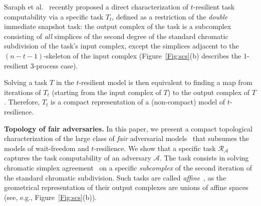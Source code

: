 \documentclass[a4paper]{article}
\newcommand{\myparagraph}[1]{\vspace{6pt}\noindent \textbf{#1}}
\newcommand{\remove}[1]{}
\def\A{\ensuremath{\mathcal{A}}}
\def\R{\ensuremath{\mathcal{R}}}
\def\fair{\textit{fair}}
\begin{document}

Saraph et al.~\cite{SHG16} recently proposed a direct characterization
of $t$-resilient %
task computability via a specific task $T_t$, defined 
as a restriction of the \emph{double} immediate snapshot
task: the output complex of the task is a subcomplex consisting of
\emph{all} simplices of the second degree of the standard chromatic
subdivision of the task's input complex, except the simplices 
adjacent to the $(n-t-1)$-skeleton of the input
complex (Figure~\ref{Fig:scs}(b) describes the $1$-resilient
$3$-process case).

Solving a %
task $T$ in the  $t$-resilient model is then equivalent to finding a map from
iterations of $T_t$ (starting from the input complex of $T$) to the output complex of $T$.   
Therefore, $T_t$ is a compact representation of a (non-compact) model
of  $t$-resilience. 


\myparagraph{Topology of fair adversaries.}
In this paper, we present a compact topological characterization
of the large class of \emph{\fair} adversarial models~\cite{KR17}
that subsumes the models of wait-freedom and $t$-resilience. 
%
We show that a specific task
$\R_{\A}$ captures the task computability of an adversary $\A$.  
The task consists in solving chromatic simplex
agreement~\cite{BG97,HS99} on a specific \emph{subcomplex} of the second
iteration of the standard chromatic  subdivision.
Such tasks are called \emph{affine}~\cite{GKM14-podc,GHKR16}, as
the geometrical representation of their output complexes are
unions of affine spaces (see, e.g., Figure~\ref{Fig:scs}(b)).  


%
\remove{ 
Our characterization is expressed in an abstract way via
\emph{agreement functions}~\cite{KR17}.
%
For each set of \emph{participating} processes (i.e., processes that
took at least one step in the
computation), the agreement function determines the best level of set
consensus that can be achieved if only these processes \emph{participate} in
the computation.
%
The agreement function corresponding to any adversary can be efficiently computed for
any adversary~\cite{GK10,KR17}.
It turns out that agreement functions encode enough information to
characterize the task computability of any {\fair}
adversary~\cite{KR17}.
}
%
\end{document}
